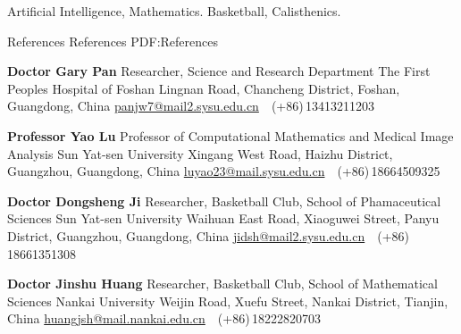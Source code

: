 \documentclass[a4paper,MMMyyyy,nonstopmode]{simpleresumecv}
\begin{document}
\begin{Body}
\Entry
Artificial Intelligence, Mathematics.
\newline
Basketball,
Calisthenics.


\Section
{{\large References}}
{{\large References}}
{PDF:References}

\BulletItem
\textbf{Doctor Gary Pan}
\newline
Researcher, Science and Research Department
\newline
The First Peoples Hospital of Foshan
 Lingnan Road, Chancheng District, Foshan, Guangdong, China
\newline
\href{mailto:panjw7@mail2.sysu.edu.cn}
{panjw7@mail2.sysu.edu.cn}
\,\SubBulletSymbol\,
(+86)\,13413211203

\BigGap
\BulletItem
\textbf{Professor Yao Lu}
\newline
Professor of Computational Mathematics and Medical Image Analysis
\newline
Sun Yat-sen University
\newline
Xingang West Road, Haizhu District, Guangzhou, Guangdong, China
\newline
\href{mailto:luyao23@mail.sysu.edu.cn}
{luyao23@mail.sysu.edu.cn}
\,\SubBulletSymbol\,
(+86)\,18664509325

\BigGap
\BulletItem
\textbf{Doctor Dongsheng Ji}
\newline
Researcher, Basketball Club, School of Phamaceutical Sciences
\newline
Sun Yat-sen University
\newline
Waihuan East Road, Xiaoguwei Street, Panyu District, Guangzhou, Guangdong, China
\newline
\href{mailto:jidshg@mail2.sysu.edu.cn}
{jidsh@mail2.sysu.edu.cn}
\,\SubBulletSymbol\,
(+86)\,18661351308

\BigGap
\BulletItem
\textbf{Doctor Jinshu Huang}
\newline
Researcher, Basketball Club, School of Mathematical Sciences
\newline
Nankai University
\newline
Weijin Road, Xuefu Street, Nankai District, Tianjin, China
\newline
\href{mailto:huangjsh@mail.nankai.edu.cn}
{huangjsh@mail.nankai.edu.cn}
\,\SubBulletSymbol\,
(+86)\,18222820703



\end{Body}
\end{document}

